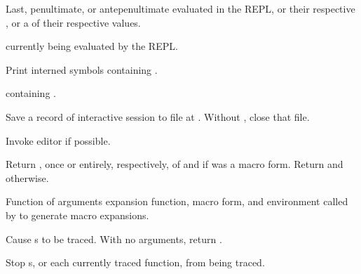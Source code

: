 \begin{LIST}{1cm}

  {
    Last, penultimate, or antepenultimate  evaluated in the REPL, or
    their respective , or a  of their respective
    values.
  }

  \IT{\V*{--}}
  {
     currently being evaluated by the REPL.
  }

  {
    Print interned symbols containing .
  }

  {
     containing .
  }

  {
    Save a record of interactive session to file at . Without
    , close that file.
  }

  {
    Invoke editor if possible.
  }

  {
    Return , once or entirely, respectively, of
     and \retvalii{\T} if  was a macro form.
    Return  and \retvalii{\NIL} otherwise.
  }

  {
    Function of arguments expansion function, macro form, and
    environment called by  to generate macro
    expansions.
  }

  {
    Cause s to be traced. With no arguments,
    return .
  }

  {
    Stop s, or each currently traced function, from being
    traced.
  }


\end{LIST}
